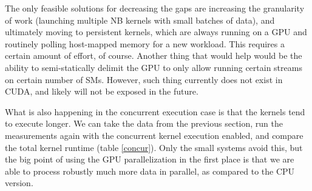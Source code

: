 \documentclass[12pt,a4paper]{report}
\begin{document}
The only feasible solutions for decreasing the gaps are increasing the granularity of work (launching multiple NB kernels with small batches of data), and ultimately moving to persistent kernels, which are always running on a GPU and routinely polling host-mapped memory for a new workload. This requires a certain amount of effort, of course. Another thing that would help would be the ability to semi-statically delimit the GPU to only allow running certain streams on certain number of SMs. However, such thing currently does not exist in CUDA, and likely will not be exposed in the future.

 What is also happening in the concurrent execution case is that the kernels tend to execute longer. We can take the data from the previous section, run the measurements again with the concurrent kernel execution enabled, and compare the total kernel runtime (table \ref{concur}). Only the small systems avoid this, but the big point of using the GPU parallelization in the first place is that we are able to process robustly much more data in parallel, as compared to the CPU version. 
 
\begin{table} 
\caption{Comparison of concurrent and non-concurrent PME GPU kernel runtime}
\label{concur}
\end{table}
\end{document}
